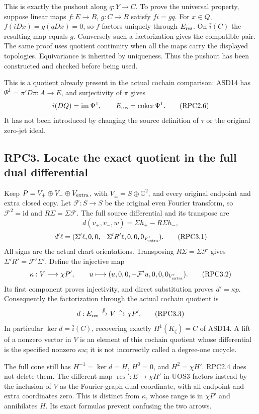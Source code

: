 This is exactly the pushout along \(q:Y\to C\). To prove the universal
property, suppose linear maps \(f:E\to B\), \(g:C\to B\) satisfy
\(fi=gq\). For \(x\in Q\), \(f(iDx)=g(qDx)=0\), so \(f\) factors
uniquely through \(E_{\rm res}\). On \(\bar i(C)\) the resulting map
equals \(g\). Conversely such a factorization gives the compatible pair.
The same proof uses quotient continuity when all the maps carry the
displayed topologies. Equivariance is inherited by uniqueness. Thus the
pushout has been constructed and checked before being used.

This is a quotient already present in the actual cochain comparison:
ASD14 has \(\Psi^1=\pi'D\pi:A\to E\), and surjectivity of \(\pi\) gives
\[
i(DQ)=\operatorname{im}\Psi^1,\qquad
E_{\rm res}=\operatorname{coker}\Psi^1.
\tag{RPC2.6}
\] It has not been introduced by changing the source definition of
\(\tau\) or the original zero-jet ideal.

\subsection{RPC3. Locate the exact quotient in the full dual
differential}\label{rpc3.-locate-the-exact-quotient-in-the-full-dual-differential}

Keep \(P=V_+\oplus V_-\oplus V_{\rm extra}\), with
\(V_\pm=S\oplus\mathbb C^2\), and every original endpoint and extra
closed copy. Let \(\mathcal F:S\to S\) be the original even Fourier
transform, so \(\mathcal F^2=\mathrm{id}\) and
\(R\Sigma=\Sigma\mathcal F\). The full source differential and its
transpose are \[
d(v_+,v_-,w)=\Sigma h_+-R\Sigma h_-,
\] \[
d'\ell=(\Sigma'\ell,0,0,-\Sigma'R'\ell,0,0,0_{V_{\rm extra}'}).
\tag{RPC3.1}
\] All signs are the actual chart orientations. Transposing
\(R\Sigma=\Sigma\mathcal F\) gives \(\Sigma'R'=\mathcal F'\Sigma'\).
Define the injective map \[
\kappa:V\longrightarrow\chi P',\qquad
u\longmapsto(u,0,0,-\mathcal F'u,0,0,0_{V_{\rm extra}'}).
\tag{RPC3.2}
\] Its first component proves injectivity, and direct substitution
proves \(d'=\kappa p\). Consequently the factorization through the
actual cochain quotient is \[
\overline d:E_{\rm res}\xrightarrow{\bar p}V\xrightarrow{\kappa}\chi P'.
\tag{RPC3.3}
\] In particular \(\ker\overline d=\bar i(C)\), recovering exactly
\(H^1(K_\zeta)=C\) of ASD14. A lift of a nonzero vector in \(V\) is an
element of this cochain quotient whose differential is the specified
nonzero \(\kappa u\); it is not incorrectly called a degree-one cocycle.

The full cone still has \(H^{-1}=\ker d=H\), \(H^0=0\), and
\(H^2=\chi H'\). RPC2.4 does not delete them. The different map
\(\operatorname{res}':E\to\chi H'\) in UOS3 factors instead by the
inclusion of \(V\) as the Fourier-graph dual coordinate, with all
endpoint and extra coordinates zero. This is distinct from \(\kappa\),
whose range is in \(\chi P'\) and annihilates \(H\). Its exact formulas
prevent confusing the two arrows.


